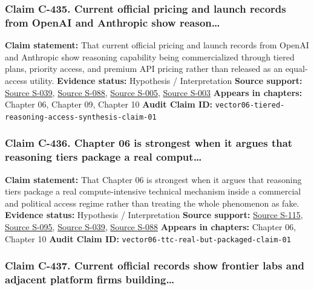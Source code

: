 \documentclass[
  american,
  11pt,
  letterpaper,
]{article}
\begin{document}
\subsubsection{Claim C-435. Current official pricing and launch records
from OpenAI and Anthropic show
reason\ldots{}}\label{claim-c-435-current-official-pricing-and-launch-records-from-openai-and-anthropic-show-reason}

\textbf{Claim statement:} That current official pricing and launch
records from OpenAI and Anthropic show reasoning capability being
commercialized through tiered plans, priority access, and premium API
pricing rather than released as an equal-access utility.
\textbf{Evidence status:} Hypothesis / Interpretation \textbf{Source
support:}
\hyperref[source-s-039-chatgpt-plans-free-go-plus-pro-business-and-enterprise]{Source
S-039}, \hyperref[source-s-088-pricing-openai-api]{Source S-088},
\hyperref[source-s-005-plans-pricing-claude-by-anthropic]{Source S-005},
\hyperref[source-s-003-introducing-claude-4]{Source S-003}
\textbf{Appears in chapters:} Chapter 06, Chapter 09, Chapter 10
\textbf{Audit Claim ID:}
\texttt{vector06-tiered-reasoning-access-synthesis-claim-01}

\subsubsection{Claim C-436. Chapter 06 is strongest when it argues that
reasoning tiers package a real
comput\ldots{}}\label{claim-c-436-chapter-06-is-strongest-when-it-argues-that-reasoning-tiers-package-a-real-comput}

\textbf{Claim statement:} That Chapter 06 is strongest when it argues
that reasoning tiers package a real compute-intensive technical
mechanism inside a commercial and political access regime rather than
treating the whole phenomenon as fake. \textbf{Evidence status:}
Hypothesis / Interpretation \textbf{Source support:}
\hyperref[source-s-115-scaling-llm-test-time-compute-optimally-can-be-more-effective-than-scaling-model-parameters]{Source
S-115}, \hyperref[source-s-095-openai-o1-system-card]{Source S-095},
\hyperref[source-s-039-chatgpt-plans-free-go-plus-pro-business-and-enterprise]{Source
S-039}, \hyperref[source-s-088-pricing-openai-api]{Source S-088}
\textbf{Appears in chapters:} Chapter 06, Chapter 10 \textbf{Audit Claim
ID:} \texttt{vector06-ttc-real-but-packaged-claim-01}

\subsubsection{Claim C-437. Current official records show frontier labs
and adjacent platform firms
building\ldots{}}\label{claim-c-437-current-official-records-show-frontier-labs-and-adjacent-platform-firms-building}
\end{document}
